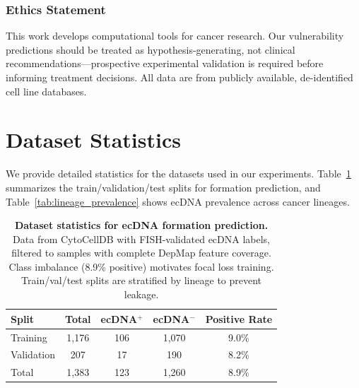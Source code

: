 \documentclass{article}
\begin{document}
\subsubsection*{Ethics Statement}
This work develops computational tools for cancer research. Our vulnerability predictions should be treated as hypothesis-generating, not clinical recommendations---prospective experimental validation is required before informing treatment decisions. All data are from publicly available, de-identified cell line databases.






\appendix

\section{Dataset Statistics}
\label{app:datasets}

We provide detailed statistics for the datasets used in our experiments. Table~\ref{tab:dataset_stats} summarizes the train/validation/test splits for formation prediction, and Table~\ref{tab:lineage_prevalence} shows ecDNA prevalence across cancer lineages.

\begin{table}[ht]
\caption{\textbf{Dataset statistics for ecDNA formation prediction.} Data from CytoCellDB with FISH-validated ecDNA labels, filtered to samples with complete DepMap feature coverage. Class imbalance (8.9\% positive) motivates focal loss training. Train/val/test splits are stratified by lineage to prevent leakage.}
\label{tab:dataset_stats}
\centering
\small
\begin{tabular}{@{}lcccc@{}}
\toprule
Split & Total & ecDNA$^+$ & ecDNA$^-$ & Positive Rate \\
\midrule
Training & 1,176 & 106 & 1,070 & 9.0\% \\
Validation & 207 & 17 & 190 & 8.2\% \\
\midrule
Total & 1,383 & 123 & 1,260 & 8.9\% \\
\bottomrule
\end{tabular}
\end{table}
\end{document}
